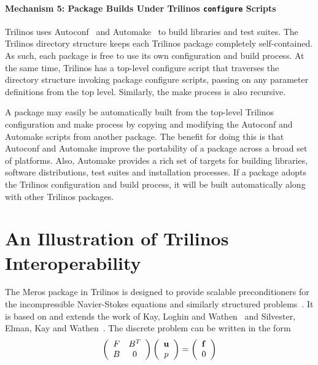 \documentclass[acmtoms,acmnow]{acmtrans2m}
\begin{document}
\paragraph*{Mechanism 5: Package Builds Under Trilinos {\tt configure} Scripts}
Trilinos uses Autoconf~\cite{Autoconf} and Automake~\cite{Automake} to
build libraries and test suites.  The Trilinos directory structure
keeps each Trilinos package completely self-contained.  As such, each
package is free to use its own configuration and build process.  At
the same time, Trilinos has a top-level configure script that traverses
the directory structure invoking package configure scripts,
passing on any parameter definitions
from the top level.  Similarly, the make process is also recursive.

A package may easily be automatically built from the top-level
Trilinos configuration and make process by copying and modifying the
Autoconf and Automake scripts from another package.  The benefit for
doing this is that Autoconf and Automake improve the portability of a
package across a broad set of platforms.  Also, Automake provides a
rich set of targets for building libraries, software distributions,
test suites and installation processes.  If a package adopts the
Trilinos configuration and build process, it will be built
automatically along with other Trilinos packages.

\section{An Illustration of Trilinos Interoperability}
\label{sect:meros}

The Meros package in Trilinos is designed to provide scalable
preconditioners for the incompressible Navier-Stokes equations and similarly
structured problems~\cite{ElmaHowlShadTumi2003}.  
It is based on and extends the work of Kay,
Loghin and Wathen~\cite{KayLoghWath2002} and Silvester, Elman, Kay and
Wathen~\cite{SilvElmaKayWath2001}.  
The discrete problem can be written in the form
\begin{equation}
\label{eq:NSmatrix}
\left(\begin{array}{cc}
	F & B^T \\
	B & 0 \\
\end{array}\right)
\left(\begin{array}{c}
	{\bf u} \\
	p \\
\end{array}\right)
=
\left(\begin{array}{c}
	{\bf f} \\
	0 \\
	\end{array}\right)
\end{equation}
\end{document}

